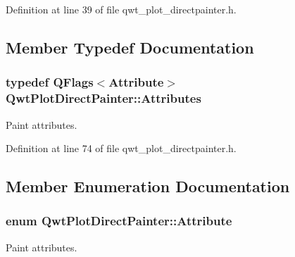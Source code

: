 Definition at line 39 of file qwt\-\_\-plot\-\_\-directpainter.\-h.



\subsection{Member Typedef Documentation}
\hypertarget{class_qwt_plot_direct_painter_a26a66587377067b3bc0539274370693f}{
\subsubsection[{Attributes}]{\setlength{\rightskip}{0pt plus 5cm}typedef Q\-Flags$<${\bf Attribute}$>$ {\bf Qwt\-Plot\-Direct\-Painter\-::\-Attributes}}}\label{class_qwt_plot_direct_painter_a26a66587377067b3bc0539274370693f}


Paint attributes. 



Definition at line 74 of file qwt\-\_\-plot\-\_\-directpainter.\-h.



\subsection{Member Enumeration Documentation}
\hypertarget{class_qwt_plot_direct_painter_a38f72175526a1a748d311763707cf934}{
\subsubsection[{Attribute}]{\setlength{\rightskip}{0pt plus 5cm}enum {\bf Qwt\-Plot\-Direct\-Painter\-::\-Attribute}}}\label{class_qwt_plot_direct_painter_a38f72175526a1a748d311763707cf934}


Paint attributes. 

